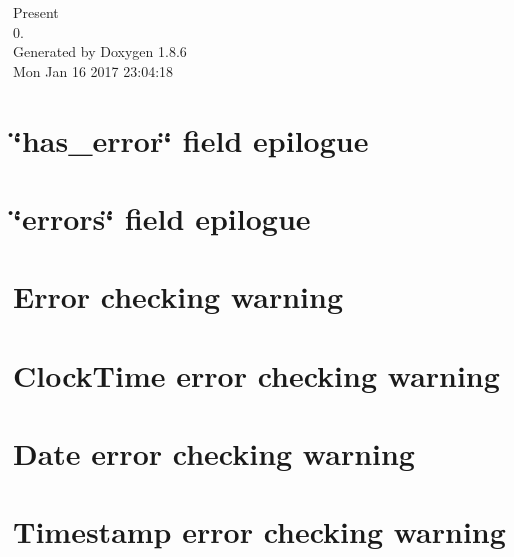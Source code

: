 \documentclass[twoside]{book}
\newcommand{\clearemptydoublepage}{%
  \newpage{\pagestyle{empty}\cleardoublepage}%
}
\begin{document}
\hypersetup{pageanchor=false}
\begin{titlepage}
\vspace*{7cm}
\begin{center}%
{\Large Present \\[1ex]\large 0. }\\
\vspace*{1cm}
{\large Generated by Doxygen 1.8.6}\\
\vspace*{0.5cm}
{\small Mon Jan 16 2017 23:04:18}\\
\end{center}
\end{titlepage}
\clearemptydoublepage
\tableofcontents
\clearemptydoublepage
{}
\hypersetup{pageanchor=true}

\chapter{\char`\"{}has\-\_\-error\char`\"{} field epilogue}
\label{has_error_epilogue}
\hypertarget{has_error_epilogue}{}

\chapter{\char`\"{}errors\char`\"{} field epilogue}
\label{errors_epilogue}
\hypertarget{errors_epilogue}{}

\chapter{Error checking warning}
\label{check_for_error}
\hypertarget{check_for_error}{}

\chapter{Clock\-Time error checking warning}
\label{check_for_error_clocktime}
\hypertarget{check_for_error_clocktime}{}

\chapter{Date error checking warning}
\label{check_for_error_date}
\hypertarget{check_for_error_date}{}

\chapter{Timestamp error checking warning}
\label{check_for_error_timestamp}
\hypertarget{check_for_error_timestamp}{}

\end{document}
